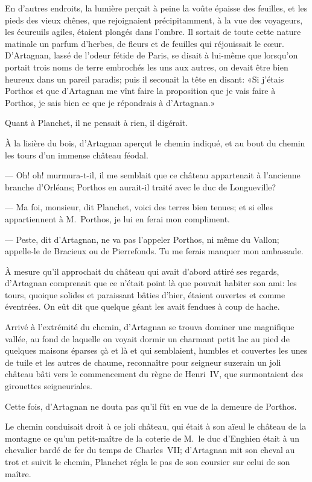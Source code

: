 En d'autres endroits, la lumière perçait à peine la voûte épaisse des feuilles, et les pieds des vieux chênes, que rejoignaient précipitamment, à la vue des voyageurs, les écureuils agiles, étaient plongés dans l'ombre. Il sortait de toute cette nature matinale un parfum d'herbes, de fleurs et de feuilles qui réjouissait le cœur. D'Artagnan, lassé de l'odeur fétide de Paris, se disait à lui-même que lorsqu'on portait trois noms de terre embrochés les uns aux autres, on devait être bien heureux dans un pareil paradis; puis il secouait la tête en disant: «Si j'étais Porthos et que d'Artagnan me vînt faire la proposition que je vais faire à Porthos, je sais bien ce que je répondrais à d'Artagnan.»

Quant à Planchet, il ne pensait à rien, il digérait.

À la lisière du bois, d'Artagnan aperçut le chemin indiqué, et au bout du chemin les tours d'un immense château féodal.

— Oh! oh! murmura-t-il, il me semblait que ce château appartenait à l'ancienne branche d'Orléans; Porthos en aurait-il traité avec le duc de Longueville?

— Ma foi, monsieur, dit Planchet, voici des terres bien tenues; et si elles appartiennent à M.~Porthos, je lui en ferai mon compliment.

— Peste, dit d'Artagnan, ne va pas l'appeler Porthos, ni même du Vallon; appelle-le de Bracieux ou de Pierrefonds. Tu me ferais manquer mon ambassade.

À mesure qu'il approchait du château qui avait d'abord attiré ses regards, d'Artagnan comprenait que ce n'était point là que pouvait habiter son ami: les tours, quoique solides et paraissant bâties d'hier, étaient ouvertes et comme éventrées. On eût dit que quelque géant les avait fendues à coup de hache.

Arrivé à l'extrémité du chemin, d'Artagnan se trouva dominer une magnifique vallée, au fond de laquelle on voyait dormir un charmant petit lac au pied de quelques maisons éparses çà et là et qui semblaient, humbles et couvertes les unes de tuile et les autres de chaume, reconnaître pour seigneur suzerain un joli château bâti vers le commencement du règne de Henri~IV, que surmontaient des girouettes seigneuriales.

Cette fois, d'Artagnan ne douta pas qu'il fût en vue de la demeure de Porthos.

Le chemin conduisait droit à ce joli château, qui était à son aïeul le château de la montagne ce qu'un petit-maître de la coterie de M.~le duc d'Enghien était à un chevalier bardé de fer du temps de Charles~VII; d'Artagnan mit son cheval au trot et suivit le chemin, Planchet régla le pas de son coursier sur celui de son maître.

